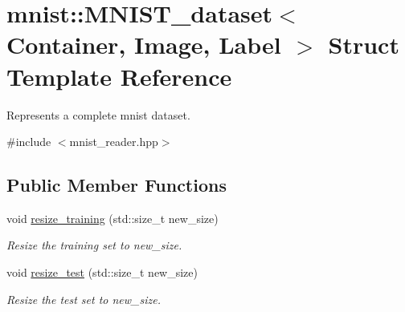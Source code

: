 \hypertarget{structmnist_1_1MNIST__dataset}{}\section{mnist\+:\+:M\+N\+I\+S\+T\+\_\+dataset$<$ Container, Image, Label $>$ Struct Template Reference}
\label{structmnist_1_1MNIST__dataset}


Represents a complete mnist dataset.  




{\ttfamily \#include $<$mnist\+\_\+reader.\+hpp$>$}

\subsection*{Public Member Functions}
\begin{DoxyCompactItemize}
\item 
void \hyperlink{structmnist_1_1MNIST__dataset_ad5e293ffcc26127d793307cd05b53e43}{resize\+\_\+training} (std\+::size\+\_\+t new\+\_\+size)
\begin{DoxyCompactList}\small\item\em Resize the training set to new\+\_\+size. \end{DoxyCompactList}\item 
void \hyperlink{structmnist_1_1MNIST__dataset_ab742c39158c61175a7be63262f4259d4}{resize\+\_\+test} (std\+::size\+\_\+t new\+\_\+size)
\begin{DoxyCompactList}\small\item\em Resize the test set to new\+\_\+size. \end{DoxyCompactList}\end{DoxyCompactItemize}
